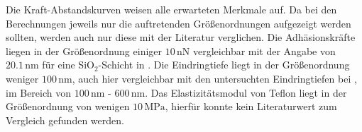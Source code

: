 Die Kraft-Abstandskurven weisen alle erwarteten Merkmale auf.
Da bei den Berechnungen jeweils nur die auftretenden Größenordnungen aufgezeigt werden sollten, 
werden auch nur diese mit der Literatur verglichen.
Die Adhäsionskräfte liegen in der Größenordnung einiger $10\,\si{\nano\newton}$
vergleichbar mit der Angabe von $20.1\,\si{\nano\meter}$ für eine SiO$_2$-Schicht in \cite{SiO}. 
Die Eindringtiefe liegt in der Größenordnung weniger $100\,\si{\nano\meter}$, 
auch hier vergleichbar mit den untersuchten Eindringtiefen bei \cite{quelle}, im Bereich von $100\,\si{\nano\meter}$ - $600\,\si{\nano\meter}$.
Das Elastizitätsmodul von Teflon liegt in der Größenordnung von wenigen $10\,\si{\mega\pascal}$, hierfür konnte kein Literaturwert zum Vergleich gefunden werden.